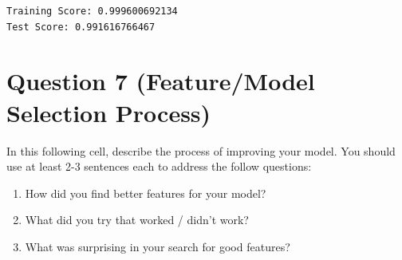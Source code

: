\documentclass[11pt]{article}
\providecommand{\tightlist}{%
      \setlength{\itemsep}{0pt}\setlength{\parskip}{0pt}}
\begin{document}
    \begin{Verbatim}[commandchars=\\\{\}]
Training Score: 0.999600692134
Test Score: 0.991616766467

    \end{Verbatim}

    \section{Question 7 (Feature/Model Selection
Process)}\label{question-7-featuremodel-selection-process}

In this following cell, describe the process of improving your model.
You should use at least 2-3 sentences each to address the follow
questions:

\begin{enumerate}
\def\labelenumi{\arabic{enumi}.}
\tightlist
\item
  How did you find better features for your model?
\item
  What did you try that worked / didn't work?
\item
  What was surprising in your search for good features?
\end{enumerate}
\end{document}
